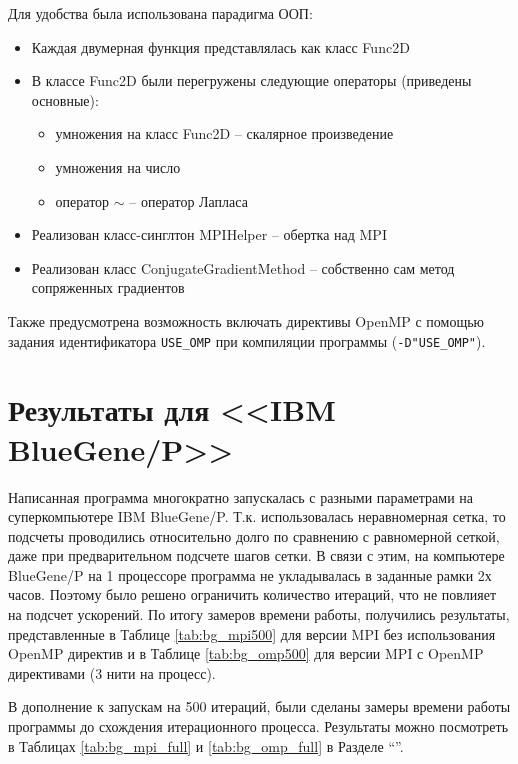 \documentclass[12pt, a4paper]{article}
\begin{document}
        Для удобства была использована парадигма ООП:
        \begin{itemize}[leftmargin=1.5cm]
            \item Каждая двумерная функция представлялась как класс Func2D
            \item В классе Func2D были перегружены следующие операторы (приведены основные):
            \begin{itemize}
                \item умножения на класс Func2D -- скалярное произведение
                \item умножения на число
                \item оператор $\sim$ -- оператор Лапласа
            \end{itemize}
            \item Реализован класс-синглтон MPIHelper -- обертка над MPI
            \item Реализован класс ConjugateGradientMethod -- собственно сам метод сопряженных градиентов
        \end{itemize}

        Также предусмотрена возможность включать директивы OpenMP с помощью задания идентификатора \verb|USE_OMP| при компиляции программы (\verb|-D"USE_OMP"|).

    \section{Результаты для <<IBM BlueGene/P>>}
        Написанная программа многократно запускалась с разными параметрами на суперкомпьютере IBM BlueGene/P. Т.к. использовалась неравномерная сетка, то подсчеты проводились относительно долго по сравнению с равномерной сеткой, даже при предварительном подсчете шагов сетки. В связи с этим, на компьютере BlueGene/P на 1 процессоре программа не укладывалась в заданные рамки 2х часов. Поэтому было решено ограничить количество итераций, что не повлияет на подсчет ускорений. По итогу замеров времени работы, получились результаты, представленные в Таблице \ref{tab:bg_mpi500} для версии MPI без использования OpenMP директив и в Таблице \ref{tab:bg_omp500} для версии MPI с OpenMP директивами (3 нити на процесс).

        В дополнение к запускам на 500 итераций, были сделаны замеры времени работы программы до схождения итерационного процесса. Результаты можно посмотреть в Таблицах \ref{tab:bg_mpi_full} и \ref{tab:bg_omp_full} в Разделе ``''.
\end{document}
